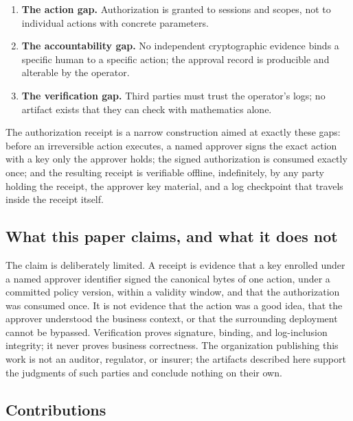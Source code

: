 \documentclass[11pt]{article}
\begin{document}
\begin{enumerate}[leftmargin=*]
\item \textbf{The action gap.} Authorization is granted to sessions and scopes,
not to individual actions with concrete parameters.
\item \textbf{The accountability gap.} No independent cryptographic evidence
binds a specific human to a specific action; the approval record is producible
and alterable by the operator.
\item \textbf{The verification gap.} Third parties must trust the operator's
logs; no artifact exists that they can check with mathematics alone.
\end{enumerate}

The authorization receipt is a narrow construction aimed at exactly these gaps:
before an irreversible action executes, a named approver signs the exact action
with a key only the approver holds; the signed authorization is consumed exactly
once; and the resulting receipt is verifiable offline, indefinitely, by any party
holding the receipt, the approver key material, and a log checkpoint that travels
inside the receipt itself.

\subsection{What this paper claims, and what it does not}

The claim is deliberately limited. A receipt is evidence that a key enrolled
under a named approver identifier signed the canonical bytes of one action, under
a committed policy version, within a validity window, and that the authorization
was consumed once. It is not evidence that the action was a good idea, that the
approver understood the business context, or that the surrounding deployment
cannot be bypassed. Verification proves signature, binding, and log-inclusion
integrity; it never proves business correctness. The organization publishing this
work is not an auditor, regulator, or insurer; the artifacts described here
support the judgments of such parties and conclude nothing on their own.

\subsection{Contributions}
\end{document}
